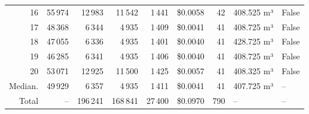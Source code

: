 \documentclass[a4paper,11pt]{article}
\begin{document}
\begin{table}[ht]
\begin{tabular}{r r r r r r r p{3cm} l}
16 & 55\,974 & 12\,983 & 11\,542 & 1\,441 & \$0.0058 & 42 & 408.525 m³ & False \\
17 & 48\,368 & 6\,344 & 4\,935 & 1\,409 & \$0.0041 & 41 & 408.725 m³ & False \\
18 & 47\,055 & 6\,336 & 4\,935 & 1\,401 & \$0.0040 & 41 & 428.725 m³ & False \\
19 & 46\,285 & 6\,341 & 4\,935 & 1\,406 & \$0.0040 & 41 & 408.725 m³ & False \\
20 & 53\,071 & 12\,925 & 11\,500 & 1\,425 & \$0.0057 & 41 & 408.325 m³ & False \\
\hline
Median. & 49\,929 & 6\,357 & 4\,935 & 1\,411 & \$0.0041 & 41 & 407.725 m³ & -- \\
Total & -- & 196\,241 & 168\,841 & 27\,400 & \$0.0970 & 790 & -- & -- \\
\hline
\end{tabular}
\end{table}

\clearpage
\end{document}
